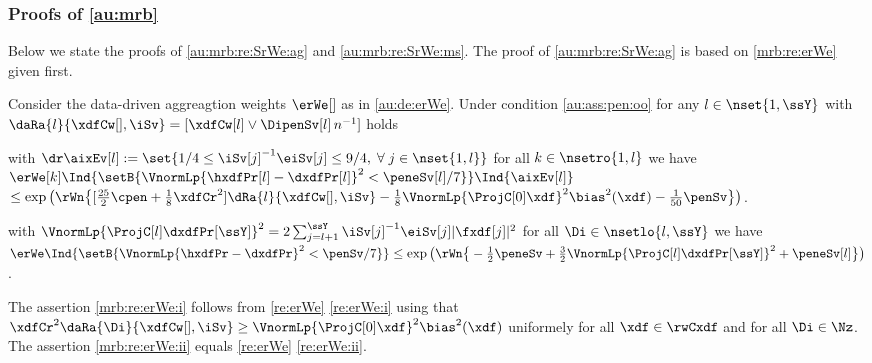 \subsubsection{Proofs of \cref{au:mrb}}\label{a:au:mrb}
\begin{te}
 Below  we state the proofs of  \cref{au:mrb:re:SrWe:ag} and \cref{au:mrb:re:SrWe:ms}. The  proof of \cref{au:mrb:re:SrWe:ag} is based on \cref{mrb:re:erWe} given first.
\end{te}
\begin{cor}\label{mrb:re:erWe} Consider the data-driven aggreagtion weights
  $\erWe[]$ as in \eqref{au:de:erWe}. Under condition
  \ref{au:ass:pen:oo} for any $l\in\nset{1,\ssY}$ with
  $\daRa{l}{\xdfCw[],\iSv}=[\xdfCw[l]\vee \DipenSv[l]\, n^{-1}]$ holds
  \begin{resListeN}[]
  \item\label{mrb:re:erWe:i} with
    $\dr\aixEv[l]:=\set{1/4\leq\iSv[j]^{-1}\eiSv[j]\leq9/4,\;\forall\;j\in\nset{1,l}}$ for all $k\in\nsetro{1,l}$ 
    we have\\
   $\erWe[k]\Ind{\setB{\VnormLp{\hxdfPr[l]-\dxdfPr[l]}^2<\peneSv[l]/7}}\Ind{\aixEv[l]}$\\\null\hfill$\leq
  \exp\big(\rWn\big\{[\tfrac{25}{2}\cpen+\tfrac{1}{8}\xdfCr^2]\dRa{l}{\xdfCw[],\iSv}-\tfrac{1}{8}\VnormLp{\ProjC[0]\xdf}^2\bias^2(\xdf)-\tfrac{1}{50}\penSv\big\}\big)$.
  \item\label{mrb:re:erWe:ii} with $\VnormLp{\ProjC[l]\dxdfPr[\ssY]}^2=2\sum_{j=l+1}^{\ssY}\iSv[j]^{-1}\eiSv[j]|\fxdf[j]|^2$
    for all $\Di\in\nsetlo{l,\ssY}$ we have\\
    $\erWe\Ind{\setB{\VnormLp{\hxdfPr-\dxdfPr}^2<\penSv/7}} \leq
   \exp\big(\rWn\big\{-\tfrac{1}{2}\peneSv+\tfrac{3}{2}\VnormLp{\ProjC[l]\dxdfPr[\ssY]}^2+\peneSv[l]\big\}\big)$.
  \end{resListeN}
\end{cor}
\begin{pro}The assertion
  \ref{mrb:re:erWe:i} follows from \cref{re:erWe} \ref{re:erWe:i}
  using that $\xdfCr^2\daRa{\Di}{\xdfCw[],\iSv}\geq\VnormLp{\ProjC[0]\xdf}^2\bias^2(\xdf)$
uniformely for all $\xdf\in\rwCxdf$ and for all
$\Di\in\Nz$.  The assertion
  \ref{mrb:re:erWe:ii} equals \cref{re:erWe} \ref{re:erWe:ii}.\proEnd
\end{pro}
